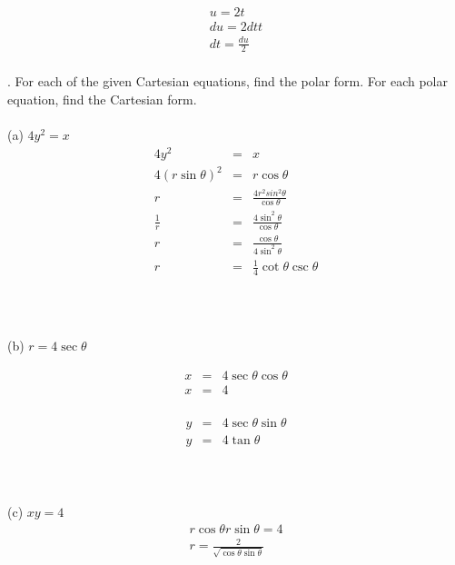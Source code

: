 \documentclass[11pt]{exam}
\begin{document}
\begin{minipage}{.5\linewidth}
	\begin{eqnarray*}
	  	u = 2t \\
	  	du = 2 dt t\\
	  	dt = \frac{du}{2} \\
	\end{eqnarray*}
\end{minipage}


. For each of the given Cartesian equations, find the polar form. For each polar equation, find the Cartesian form. \\
\\
\indent (a) $4y^2 = x$
\\
\begin{eqnarray*}
	4y^2 &=& x \\
	4(r \sin \theta)^2 &=& r\cos \theta \\
	r &=& \frac{4 r^2 sin^2 \theta}{\cos \theta} \\
	\frac{1}{r} &=& \frac{4 \sin^2 \theta}{\cos \theta} \\
	r &=& \frac{\cos \theta}{4 \sin^2 \theta} \\
	r &=& \frac{1}{4}\cot \theta \csc \theta \\
\end{eqnarray*}
\\
\\
\\
\indent (b) $r = 4\sec \theta$
\\
\noindent
\begin{minipage}{.5\linewidth}
	\begin{eqnarray*}
		x &=& 4\sec\theta\cos\theta \\
		x &=& 4 \\
	\end{eqnarray*}
\end{minipage}
\begin{minipage}{.5\linewidth}
	\begin{eqnarray*}
		y &=& 4\sec\theta\sin\theta \\
		y &=& 4\tan\theta \\
	\end{eqnarray*}
\end{minipage}
\\
\\
\indent (c) $xy = 4$
\\
\begin{eqnarray*}
	r\cos\theta r\sin\theta = 4 \\
	r = \frac{2}{\sqrt{\cos\theta\sin\theta}} \\
\end{eqnarray*}
\end{document}
